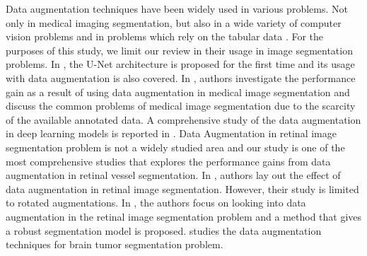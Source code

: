\documentclass{article}
\begin{document}
Data augmentation techniques have been widely used in various problems. Not only in medical imaging segmentation, but also in a wide variety of computer vision problems and in problems which rely on the tabular data \cite{article3}. For the purposes of this study, we limit our review in their usage in image segmentation problems. In \cite{ronneberger2015unet}, the U-Net architecture is proposed for the first time and its usage with data augmentation is also covered. In \cite{EatonRosen2018ImprovingDA}, authors investigate the performance gain as a result of  using data augmentation in medical image segmentation and discuss the common problems of medical image segmentation due to the scarcity of the available annotated data. A comprehensive study of the data augmentation in deep learning models is reported in \cite{Shorten2019ASO}. Data Augmentation in retinal image segmentation problem is not a widely studied area and our study is one of the most comprehensive studies that explores the performance gains from data augmentation in retinal vessel segmentation. In \cite{10.1145/3348416.3348425}, authors lay out the effect of data augmentation in retinal image segmentation. However, their study is limited to rotated augmentations. In \cite{sun2020robust}, the authors focus on looking into  data augmentation in the retinal image segmentation problem and a method that gives a robust segmentation model is proposed. \cite{10.3389/fncom.2019.00083} studies the data augmentation techniques for brain tumor segmentation problem.\\\\
\end{document}

